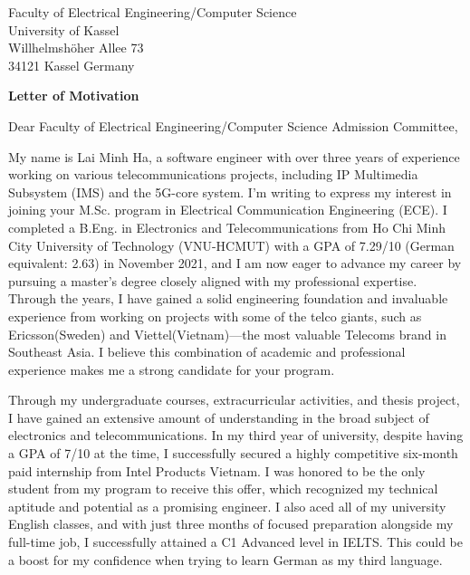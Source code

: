 \documentclass[a4paper,12pt]{letter}
\date{}
\begin{document}
\begin{letter}{
    Faculty of Electrical Engineering/Computer Science
    \\ University of Kassel
    \\ Willhelmshöher Allee 73
    \\ 34121 Kassel Germany
}

\vspace*{-1.5cm}
\begin{center}
    \LARGE \textbf{Letter of Motivation}
\end{center}

\vspace{0.2cm} %

\opening{Dear Faculty of Electrical Engineering/Computer Science Admission Committee,}

My name is Lai Minh Ha, a software engineer with over three years of experience working on various telecommunications projects, including IP Multimedia Subsystem (IMS) and the 5G-core system. I'm writing to express my interest in joining your M.Sc. program in Electrical Communication Engineering (ECE). I completed a B.Eng. in Electronics and Telecommunications from Ho Chi Minh City University of Technology (VNU-HCMUT) with a GPA of 7.29/10 (German equivalent: 2.63) in November 2021, and I am now eager to advance my career by pursuing a master’s degree closely aligned with my professional expertise. Through the years, I have gained a solid engineering foundation and invaluable experience from working on projects with some of the telco giants, such as Ericsson(Sweden) and Viettel(Vietnam)—the most valuable Telecoms brand in Southeast Asia. I believe this combination of academic and professional experience makes me a strong candidate for your program.

Through my undergraduate courses, extracurricular activities, and thesis project, I have gained an extensive amount of understanding in the broad subject of electronics and telecommunications. In my third year of university, despite having a GPA of 7/10 at the time, I successfully secured a highly competitive six-month paid internship from Intel Products Vietnam. I was honored to be the only student from my program to receive this offer, which recognized my technical aptitude and potential as a promising engineer. I also aced all of my university English classes, and with just three months of focused preparation alongside my full-time job, I successfully attained a C1 Advanced level in IELTS. This could be a boost for my confidence when trying to learn German as my third language.


\end{letter}
\end{document}
